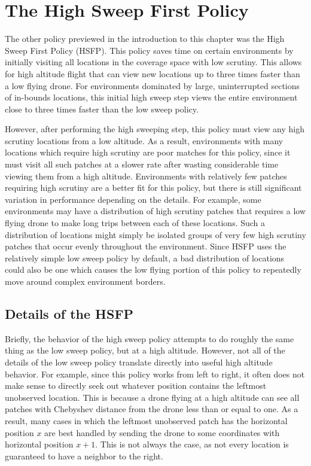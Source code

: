 \section{The High Sweep First Policy}

The other policy previewed in the introduction to this chapter was the High Sweep First Policy (HSFP). This policy saves time on certain environments by initially visiting all locations in the coverage space with low scrutiny. This allows for high altitude flight that can view new locations up to three times faster than a low flying drone. For environments dominated by large, uninterrupted sections of in-bounds locations, this initial high sweep step views the entire environment close to three times faster than the low sweep policy.

However, after performing the high sweeping step, this policy must view any high scrutiny locations from a low altitude. As a result, environments with many locations which require high scrutiny are poor matches for this policy, since it must visit all such patches at a slower rate after wasting considerable time viewing them from a high altitude. Environments with relatively few patches requiring high scrutiny are a better fit for this policy, but there is still significant variation in performance depending on the details. For example, some environments may have a distribution of high scrutiny patches that requires a low flying drone to make long trips between each of these locations. Such a distribution of locations might simply be isolated groups of very few high scrutiny patches that occur evenly throughout the environment. Since HSFP uses the relatively simple low sweep policy by default, a bad distribution of locations could also be one which causes the low flying portion of this policy to repeatedly move around complex environment borders.

\subsection{Details of the HSFP}

Briefly, the behavior of the high sweep policy attempts to do roughly the same thing as the low sweep policy, but at a high altitude. However, not all of the details of the low sweep policy translate directly into useful high altitude behavior. For example, since this policy works from left to right, it often does not make sense to directly seek out whatever position contains the leftmost unobserved location. This is because a drone flying at a high altitude can see all patches with Chebyshev distance from the drone less than or equal to one. As a result, many cases in which the leftmost unobserved patch has the horizontal position $x$ are best handled by sending the drone to some coordinates with horizontal position $x+1$. This is not always the case, as not every location is guaranteed to have a neighbor to the right.

